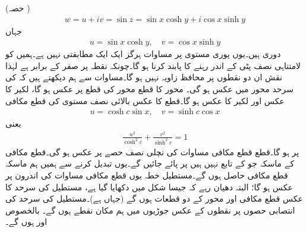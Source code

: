  (حصہ ) 
\begin{align}\label{مساوات_محافظ_سائن_الف}
w=u+iv=\sin z=\sin x\cosh y+i\cos x\sinh y
\end{align}
جہاں
\begin{align}\label{مساوات_محافظ_سائن_ب}
u=\sin x\cosh y,\quad v=\cos x\sinh y
\end{align}
دوری ہیں۔یوں پوری  مستوی پر مساوات  ہرگز ایک ایک مطابقتی نہیں ہے۔ہمیں  کو لامتناہی نصف پٹی
  کے اندر رہنے کا پابند کرنا ہو گا۔چونکہ  نقطہ  پر صفر کے برابر ہے لہٰذا نقش ان دو نقطوں پر محافظ زاویہ نہیں ہو گا۔مساوات  سے ہم دیکھتے ہیں کہ  کی سرحد  محور میں  عکس  ہو گی۔ محور کا قطع  محور  کی قطع   پر عکس ہو گا، لکیر  کا عکس  اور  لکیر   کا عکس  ہو گا۔قطع  کا عکس بالائی نصف  مستوی کی قطع مکافی
\begin{align*}
u=\cosh c\sin x,\quad v=\sinh c\cos x
\end{align*}
یعنی
\begin{align}\label{مساوات_نقش_قطع_مکافی}
\frac{u^2}{\cosh^2 c}+\frac{v^2}{\sinh^2 c}=1
\end{align}
پر ہو گا۔قطع    قطع مکافی مساوات  کی نچلی نصف حصے پر عکس ہو گی۔قطع مکافی کے ماسکہ  جو  کے تابع نہیں ہیں  پر پائے جائیں گے۔یوں  تبدیل کرنے سے ہمیں ہم ماسکہ قطع مکافی حاصل ہوں گے۔مستطیل خطہ   یوں قطع مکافی مساوات  کی اندرون پر عکس ہو گا؛ البتہ دھیان رہے کہ جیسا شکل  میں دکھایا گیا ہے، مستطیل کی سرحد کا عکس قطع مکافی اور  محور کے دو قطعات ہوں گے (جہاں  ہے)۔مستطیل کی سرحد کی  انتصابی حصوں پر نقطوں کے عکس جوڑیوں میں ہم مکان نقطے ہوں گے۔  بالخصوص  اور  ہوں گے۔
